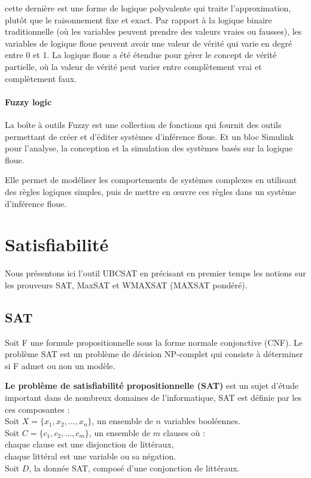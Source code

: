 cette dernière est une forme de logique polyvalente qui traite l’approximation, plutôt que le raisonnement fixe et exact. Par rapport à la logique binaire traditionnelle (où les variables peuvent prendre des valeurs vraies ou fausses), les variables de logique floue peuvent avoir une valeur de vérité qui varie en degré entre 0 et 1. La logique floue a été étendue pour gérer le concept de vérité partielle, où la valeur de vérité peut varier entre complètement vrai et complètement faux. 
\paragraph{Fuzzy logic} 
\vspace{1em}
La boîte à outils  Fuzzy est une collection de fonctions qui fournit des outils permettant de créer et d'éditer systèmes d'inférence floue. Et un bloc Simulink pour l'analyse, la conception et la simulation des systèmes basés sur la logique floue.

Elle permet de modéliser les comportements de systèmes complexes en utilisant des règles logiques simples, puis de mettre en œuvre ces règles dans un système d'inférence floue.

\section{Satisfiabilité}

Nous présentons ici l'outil UBCSAT en précisant en premier temps les notions sur les prouveurs SAT, MaxSAT et WMAXSAT (MAXSAT pondéré). 
\subsection{SAT}
Soit F une formule propositionnelle sous la forme normale conjonctive (CNF). Le problème SAT est un problème de décision NP-complet qui consiste à déterminer si F admet ou non un modèle.\cite{hassenThesis}

\textbf{Le problème de satisfiabilité propositionnelle (SAT)} est un sujet d'étude important dans de nombreux domaines de l'informatique, SAT est définie par les ces composantes :\\
\hspace{2em}Soit $X=\{x_1, x_2,\dots, x_n\}$, un ensemble de $n$ variables booléennes.\\
\hspace{2em}Soit $C=\{c_1, c_2,\dots, c_m\}$, un ensemble de $m$ clauses où :\\
\hspace{2em}chaque clause est une disjonction de littéraux,\\
\hspace{2em}chaque littéral est une variable ou sa négation.\\
\hspace{2em}Soit $D$, la donnée SAT, composé d'une conjonction de littéraux.

